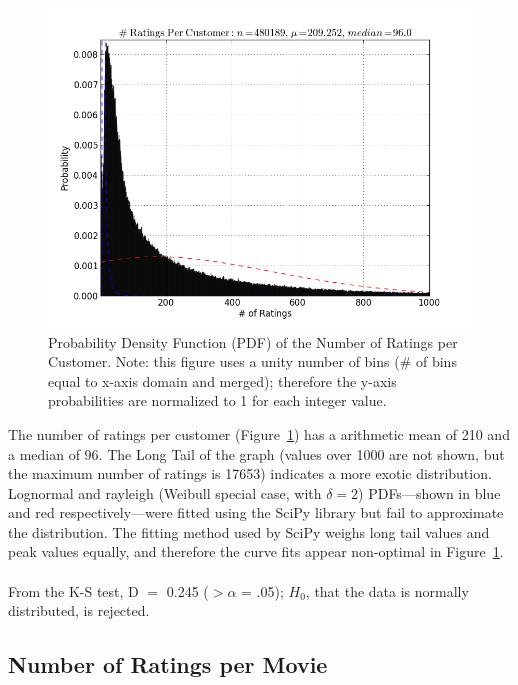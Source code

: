 \documentclass{acmtog}
\begin{document}
\begin{figure}
\centerline{\includegraphics[scale=.45]{num_ratings_per_customer.png}}
\caption{Probability Density Function (PDF) of the Number of Ratings per Customer. Note: this figure uses a unity number of bins (\# of bins equal to x-axis domain and merged); therefore the y-axis probabilities are normalized to 1 for each integer value.}
\label{fig:five}
\end{figure}

The number of ratings per customer (Figure~\ref{fig:five}) has a arithmetic mean of 210 and a median of 96. The Long Tail of the graph (values over 1000 are not shown, but the maximum number of ratings is 17653) indicates a more exotic distribution. Lognormal and rayleigh (Weibull special case, with $\delta = 2$) PDFs---shown in blue and red respectively---were fitted using the SciPy library but fail to approximate the distribution. The fitting method used by SciPy weighs long tail values and peak values equally, and therefore the curve fits appear non-optimal in Figure~\ref{fig:five}.
\\
\\
From the K-S test, D $=$ 0.245 ($>\alpha$ = .05); $H_0$, that the data is normally distributed, is rejected.

\subsection{Number of Ratings per Movie}
\end{document}
